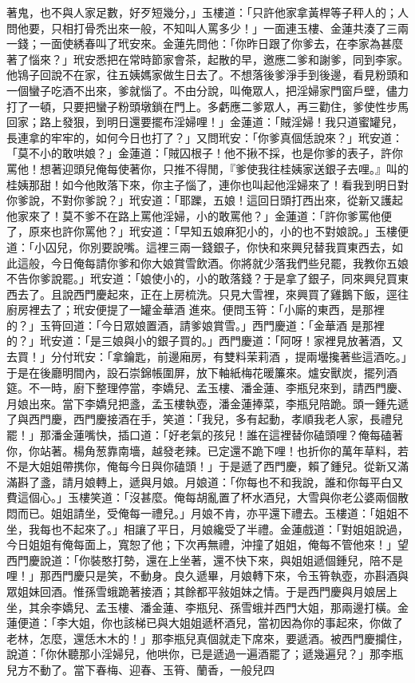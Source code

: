 著鬼，也不與人家足數，好歹短幾分，」玉樓道：「只許他家拿黃桿等子秤人的；人問他要，只相打骨禿出來一般，不知叫人罵多少！」一面連玉樓、金蓮共湊了三兩一錢；一面使綉春叫了玳安來。金蓮先問他：「你昨日跟了你爹去，在李家為甚麼著了惱來？」玳安悉把在常時節家會茶，起散的早，邀應二爹和謝爹，同到李家。他鴇子回說不在家，往五姨媽家做生日去了。不想落後爹淨手到後邊，看見粉頭和一個蠻子吃酒不出來，爹就惱了。不由分說，叫俺眾人，把淫婦家門窗戶壁，儘力打了一頓，只要把蠻子粉頭墩鎖在門上。多虧應二爹眾人，再三勸住，爹使性步馬回家；路上發狠，到明日還要擺布淫婦哩！」金蓮道：「賊淫婦！我只道蜜罐兒，長連拿的牢牢的，如何今日也打了？」又問玳安：「你爹真個恁說來？」玳安道：「莫不小的敢哄娘？」金蓮道：「賊囚根子！他不揪不採，也是你爹的表子，許你罵他！想著迎頭兒俺每使著你，只推不得閒，『爹使我往桂姨家送銀子去哩。』叫的桂姨那甜！如今他敗落下來，你主子惱了，連你也叫起他淫婦來了！看我到明日對你爹說，不對你爹說？」玳安道：「耶躒，五娘！這回日頭打西出來，從新又護起他家來了！莫不爹不在路上罵他淫婦，小的敢罵他？」金蓮道：「許你爹罵他便了，原來也許你罵他？」玳安道：「早知五娘麻犯小的，小的也不對娘說。」玉樓便道：「小囚兒，你別要說嘴。這裡三兩一錢銀子，你快和來興兒替我買東西去，如此這般，今日俺每請你爹和你大娘賞雪飲酒。你將就少落我們些兒罷，我教你五娘不告你爹說罷。」玳安道：「娘使小的，小的敢落錢？于是拿了銀子，同來興兒買東西去了。且說西門慶起來，正在上房梳洗。只見大雪裡，來興買了雞鵝下飯，逕往廚房裡去了；玳安便提了一罐金華酒 進來。便問玉筲：「小廝的東西，是那裡的？」玉筲回道：「今日眾娘置酒，請爹娘賞雪。」西門慶道：「金華酒 是那裡的？」玳安道：「是三娘與小的銀子買的。」西門慶道：「阿呀！家裡見放著酒，又去買！」分付玳安：「拿鑰匙，前邊廂房，有雙料茉莉酒 ，提兩壜攙著些這酒吃。」于是在後廳明間內，設石崇錦帳圍屏，放下軸紙梅花暖簾來。爐安獸炭，擺列酒筵。不一時，廚下整理停當，李嬌兒、孟玉樓、潘金蓮、李瓶兒來到，請西門慶、月娘出來。當下李嬌兒把盞，孟玉樓執壺，潘金蓮捧菜，李瓶兒陪跪。頭一鍾先遞了與西門慶，西門慶接酒在手，笑道：「我兒，多有起動，孝順我老人家，長禮兒罷！」那潘金蓮嘴快，插口道：「好老氣的孩兒！誰在這裡替你磕頭哩？俺每磕著你，你站著。楊角葱靠南墻，越發老辣。已定還不跪下哩！也折你的萬年草料，若不是大姐姐帶携你，俺每今日與你磕頭！」于是遞了西門慶，賴了鍾兒。從新又滿滿斟了盞，請月娘轉上，遞與月娘。月娘道：「你每也不和我說，誰和你每平白又費這個心。」玉樓笑道：「沒甚麼。俺每胡亂置了杯水酒兒，大雪與你老公婆兩個散悶而已。姐姐請坐，受俺每一禮兒。」月娘不肯，亦平還下禮去。玉樓道：「姐姐不坐，我每也不起來了。」相讓了平日，月娘纔受了半禮。金蓮戲道：「對姐姐說過，今日姐姐有俺每面上，寬恕了他；下次再無禮，沖撞了姐姐，俺每不管他來！」望西門慶說道：「你裝憨打勢，還在上坐著，還不快下來，與姐姐遞個鍾兒，陪不是哩！」那西門慶只是笑，不動身。良久遞畢，月娘轉下來，令玉筲執壺，亦斟酒與眾姐妹回酒。惟孫雪蛾跪著接酒；其餘都平敍姐妹之情。于是西門慶與月娘居上坐，其余李嬌兒、孟玉樓、潘金蓮、李瓶兒、孫雪蛾并西門大姐，那兩邊打橫。金蓮便道：「李大姐，你也該梯已與大姐姐遞杯酒兒，當初因為你的事起來，你做了老林，怎麼，還恁木木的！」那李瓶兒真個就走下席來，要遞酒。被西門慶攔住，說道：「你休聽那小淫婦兒，他哄你，已是遞過一遍酒罷了；遞幾遍兒？」那李瓶兒方不動了。當下春梅、迎春、玉筲、蘭香，一般兒四